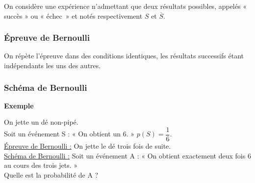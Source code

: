 On considère une expérience n'admettant que deux résultats possibles, appelés « succès » ou « échec~» et notés respectivement $S$ et $\overline{S} $.

\subsubsection{Épreuve de Bernoulli}

On répète l'épreuve dans des conditions identiques, les résultats successifs étant indépendants les uns des autres. 

\subsubsection{Schéma de Bernoulli}

\textbf{Exemple}

On jette un dé non-pipé. \\ Soit un événement S : « On obtient un 6. » $p\left(S\right) = \dfrac{1}{6} $. \\

\underline{Épreuve de Bernoulli :} On jette le dé trois fois de suite. \\

\underline{Schéma de Bernoulli :} Soit un événement A : « On obtient exactement deux fois 6 au cours des trois jets. » \\

Quelle est la probabilité de A ? \\

